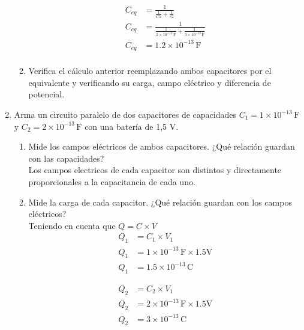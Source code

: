 \documentclass[12pt]{report}
\begin{document}
\begin{enumerate}
\begin{enumerate}
            \begin{align*}
                C_{eq}&= \frac{1}{\frac{1}{C1}+\frac{1}{c2}}\\[6pt]
                C_{eq}&= \frac{1}{\frac{1}{2 \times 10^{-13} \,\text{F}}+\frac{1}{3 \times 10^{-13} \,\text{F} }}\\[6pt]
                C_{eq}&= 1.2 \times 10^{-13} \,\text{F}\\[12pt]
            \end{align*}

        \item Verifica el cálculo anterior reemplazando ambos capacitores por el equivalente y verificando su carga, campo eléctrico y diferencia de potencial.
    \end{enumerate}
    
    \item Arma un circuito paralelo de dos capacitores de capacidades $C_1 = 1 \times 10^{-13} \, \text{F}$ y $C_2 = 2 \times 10^{-13} \, \text{F}$ con una batería de 1,5 V.
    \begin{enumerate}
        \item Mide los campos eléctricos de ambos capacitores. ¿Qué relación guardan con las capacidades?\\
            Los campos electricos de cada capacitor son distintos y directamente proporcionales a la capacitancia de cada uno.\\
        \item Mide la carga de cada capacitor. ¿Qué relación guardan con los campos eléctricos?\\

            Teniendo en cuenta que $Q=C \times V$\\
            
            \begin{align*}
            Q_1&= C_1 \times V_1\\[6pt]
            Q_1&= 1 \times 10^{-13} \,\text{F} \times 1.5 \text{V}\\[6pt]
            Q_1&= 1.5\times 10^{-13} \,\text{C}
            \end{align*}


            \begin{align*}
            Q_2&= C_2 \times V_1\\[6pt]
            Q_2&= 2 \times 10^{-13} \,\text{F} \times 1.5 \text{V}\\[6pt]
            Q_2&= 3\times 10^{-13} \,\text{C}\\[12pt] 
            \end{align*}


\end{enumerate}
\end{enumerate}
\end{document}
